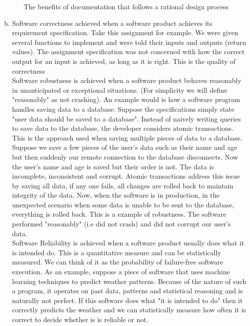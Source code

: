 \documentclass[12pt]{article}
\begin{document}
\begin{enumerate}[(a)]
\begin{itemize}[(a)]
The benefits of documentation that follows a rational design process
\end{itemize}

\item Software correctness achieved when a software product achieves its requirement specification. Take this assignment for example. We were given several functions to implement and were told their inputs and outputs (return values). The assignment specification was not concerned with how the correct output for an input is achieved, as long as it is right. This is the quality of correctness\\

Software robustness is achieved when a software product behaves reasonably in unanticipated or exceptional situations. (For simplicity we will define "reasonably" as not crashing). An example would is how a software program handles saving data to a database. Suppose the specifications simply state "user data should be saved to a database". Instead of naively writing queries to save data to the database, the developer considers atomic transactions. This is the approach used when saving multiple pieces of data to a database. Suppose we save a few pieces of the user's data such as their name and age but then suddenly our remote connection to the database disconnects. Now the user's name and age is saved but their order is not. The data is incomplete, inconsistent and corrupt. Atomic transactions address this issue by saving all data, if any one fails, all changes are rolled back to maintain integrity of the data. Now, when the software is in production, in the unexpected scenario when some data is unable to be sent to the database, everything is rolled back. This is a example of robustness. The software performed "reasonably" (i.e did not crash) and did not corrupt our user's data.\\

Software Reliability is achieved when a software product usually does what it is intended do. This is a quantitative measure and can be statistically measured. We can think of it as the probability of failure-free software execution. As an example, suppose a piece of software that uses machine learning techniques to predict weather patterns. Because of the nature of such a program, it operates on past data, patterns and statistical reasoning and is naturally not perfect. If this software does what "it is intended to do" then it correctly predicts the weather and we can statistically measure how often it is correct to decide whether is is reliable or not.


\end{enumerate}
\end{document}
